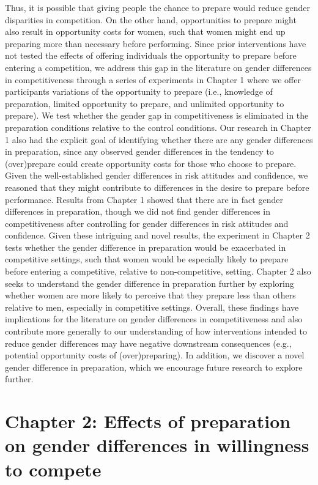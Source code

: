 \documentclass[letterpaper, nobind]{templates/ociamthesis}
\begin{document}
Thus, it is possible that giving people the chance to prepare would reduce gender disparities in competition. On the other hand, opportunities to prepare might also result in opportunity costs for women, such that women might end up preparing more than necessary before performing. Since prior interventions have not tested the effects of offering individuals the opportunity to prepare before entering a competition, we address this gap in the literature on gender differences in competitiveness through a series of experiments in Chapter 1 where we offer participants variations of the opportunity to prepare (i.e., knowledge of preparation, limited opportunity to prepare, and unlimited opportunity to prepare). We test whether the gender gap in competitiveness is eliminated in the preparation conditions relative to the control conditions. Our research in Chapter 1 also had the explicit goal of identifying whether there are any gender differences in preparation, since any observed gender differences in the tendency to (over)prepare could create opportunity costs for those who choose to prepare. Given the well-established gender differences in risk attitudes and confidence, we reasoned that they might contribute to differences in the desire to prepare before performance. Results from Chapter 1 showed that there are in fact gender differences in preparation, though we did not find gender differences in competitiveness after controlling for gender differences in risk attitudes and confidence. Given these intriguing and novel results, the experiment in Chapter 2 tests whether the gender difference in preparation would be exacerbated in competitive settings, such that women would be especially likely to prepare before entering a competitive, relative to non-competitive, setting. Chapter 2 also seeks to understand the gender difference in preparation further by exploring whether women are more likely to perceive that they prepare less than others relative to men, especially in competitive settings. Overall, these findings have implications for the literature on gender differences in competitiveness and also contribute more generally to our understanding of how interventions intended to reduce gender differences may have negative downstream consequences (e.g., potential opportunity costs of (over)preparing). In addition, we discover a novel gender difference in preparation, which we encourage future research to explore further.

\hypertarget{chapter-2-effects-of-preparation-on-gender-differences-in-willingness-to-compete}{%
\chapter{Chapter 2: Effects of preparation on gender differences in willingness to compete}\label{chapter-2-effects-of-preparation-on-gender-differences-in-willingness-to-compete}}
\end{document}
